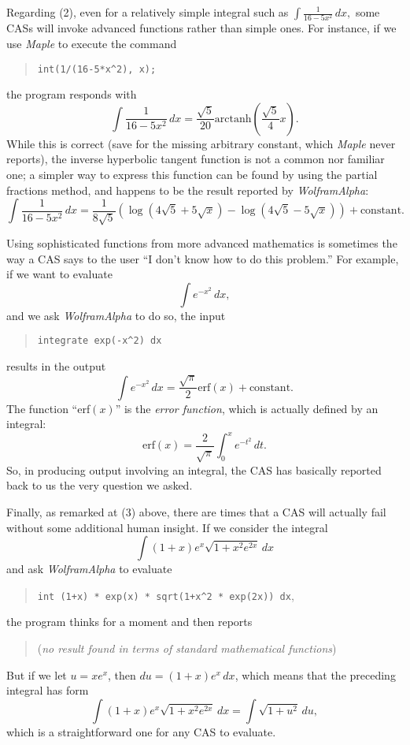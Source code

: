 Regarding (2), even for a relatively simple integral such as $\int \frac{1}{16-5x^2} \, dx,$ some CASs will invoke advanced functions rather than simple ones.  For instance, if we use \emph{Maple} to execute the command
\begin{quote}
\texttt{int(1/(16-5*x\^{}2), x);}
\end{quote}
the program responds with 
$$\int \frac{1}{16-5x^2} \, dx = \frac{\sqrt{5}}{20} \mbox{arctanh}\left(\frac{\sqrt{5}}{4}x\right).$$ 
While this is correct (save for the missing arbitrary constant, which \emph{Maple} never reports), the inverse hyperbolic tangent function is not a common nor familiar one; a simpler way to express this function can be found by using the partial fractions method, and happens to be the result reported by \emph{WolframAlpha}:\small
$$\int \frac{1}{16-5x^2} \, dx = \frac{1}{8\sqrt{5}} \left(\log(4\sqrt{5}+5\sqrt{x}) - \log(4\sqrt{5}-5\sqrt{x})\right) + \mbox{constant}.$$\normalsize

Using sophisticated functions from more advanced mathematics is sometimes the way a CAS says to the user ``I don't know how to do this problem.''  For example, if we want to evaluate 
$$\int e^{-x^2} \, dx,$$
and we ask \emph{WolframAlpha} to do so, the input
\begin{quote}
\texttt{integrate exp(-x\^{}2) dx}
\end{quote} 
results in the output
$$\int e^{-x^2} \, dx = \frac{\sqrt{\pi}}{2}\mbox{erf}(x) + \mbox{constant}.$$
The function ``erf$(x)$'' is the \emph{error function}, which is actually defined by an integral:
$$\mbox{erf}(x) = \frac{2}{\sqrt{\pi}} \int_0^x e^{-t^2} \, dt.$$
So, in producing output involving an integral, the CAS has basically reported back to us the very question we asked.

Finally, as remarked at (3) above, there are times that a CAS will actually fail without some additional human insight.  If we consider the integral
$$\int (1+x)e^x \sqrt{1+x^2e^{2x}} \, dx $$
and ask \emph{WolframAlpha} to evaluate
\begin{quote}
\texttt{int (1+x) * exp(x) * sqrt(1+x\^{}2 * exp(2x)) dx},
\end{quote}
the program thinks for a moment and then reports
\begin{quote}
(\emph{no result found in terms of standard mathematical functions})
\end{quote}
But if we let $u = xe^{x}$, then $du = (1+x)e^x \, dx$, which means that the preceding integral has form
$$\int (1+x)e^x \sqrt{1+x^2e^{2x}} \, dx = \int \sqrt{1+u^2} \, du, $$
which is a straightforward one for any CAS to evaluate.


